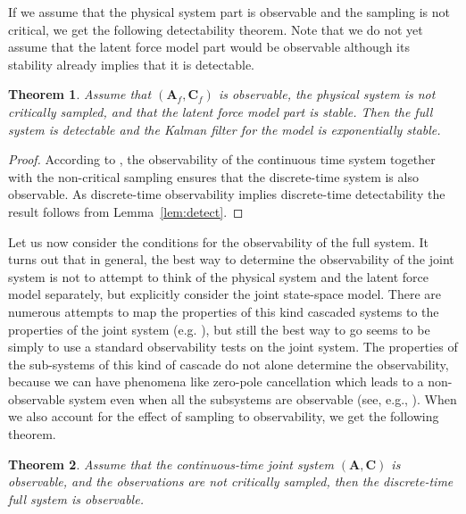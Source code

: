 \documentclass[journal]{IEEEtran}
\newtheorem{theorem}{Theorem}[section]
\begin{document}
If we assume that the physical system part is observable and the sampling is not critical, we get the following detectability theorem. Note that we do not yet assume that the latent force model part would be observable although its stability already implies that it is detectable.
%
\begin{theorem} \label{the:detect}
Assume that $(\mathbf{A}_f,\mathbf{C}_f)$ is observable, the physical system is not critically sampled, and that the latent force model part is stable. Then the full system is detectable and the Kalman filter for the model is exponentially stable.
\end{theorem}

\begin{proof}
According to \cite{Ding:2009}, the observability of the continuous time system together with the non-critical sampling ensures that the discrete-time system is also observable. As discrete-time observability implies discrete-time detectability the result follows from Lemma~\ref{lem:detect}.
\end{proof}

Let us now consider the conditions for the observability of the full system. It turns out that in general, the best way to determine the observability of the joint system is not to attempt to think of the physical system and the latent force model separately, but explicitly consider the joint state-space model. There are numerous attempts to map the properties of this kind cascaded systems to the properties of the joint system (e.g. \cite{Gilbert:1963,Chen:1967,Davison:1975}), but still the best way to go seems to be simply to use a standard observability tests on the joint system. The properties of the sub-systems of this kind of cascade do not alone determine the observability, because we can have phenomena like zero-pole cancellation which leads to a non-observable system even when all the subsystems are observable (see, e.g., \cite{Gilbert:1963}). When we also account for the effect of sampling to observability, we get the following theorem.

\begin{theorem} \label{the:obsv}
Assume that the continuous-time joint system $(\mathbf{A},\mathbf{C})$ is observable, and the
observations are not critically sampled, then the discrete-time full system is observable.
\end{theorem} 
\end{document}
